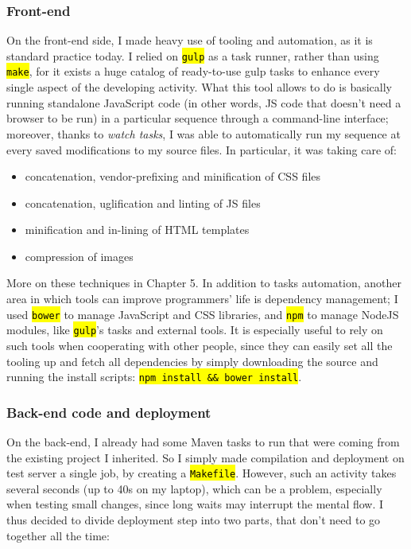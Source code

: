\documentclass[12pt,svgnames]{memoir}
\let\OldTexttt\texttt
\renewcommand{\texttt}[1]{\OldTexttt{\hl{#1}}}
\begin{document}
\subsubsection*{Front-end}\label{front-end}

On the front-end side, I made heavy use of tooling and automation, as it
is standard practice today. I relied on \texttt{gulp} as a task runner,
rather than using \texttt{make}, for it exists a huge catalog of
ready-to-use gulp tasks to enhance every single aspect of the developing
activity. What this tool allows to do is basically running standalone
JavaScript code (in other words, JS code that doesn't need a browser to
be run) in a particular sequence through a command-line interface;
moreover, thanks to \emph{watch tasks}, I was able to automatically run
my sequence at every saved modifications to my source files. In
particular, it was taking care of:

\begin{itemize}
\itemsep1pt\parskip0pt
\item
  concatenation, vendor-prefixing and minification of CSS files
\item
  concatenation, uglification and linting of JS files
\item
  minification and in-lining of HTML templates
\item
  compression of images
\end{itemize}

More on these techniques in Chapter 5. In addition to tasks automation,
another area in which tools can improve programmers' life is dependency
management; I used \texttt{bower} to manage JavaScript and CSS
libraries, and \texttt{npm} to manage NodeJS modules, like
\texttt{gulp}'s tasks and external tools. It is especially useful to
rely on such tools when cooperating with other people, since they can
easily set all the tooling up and fetch all dependencies by simply
downloading the source and running the install scripts:
\texttt{npm install \&\& bower install}.

\subsubsection*{Back-end code and
deployment}\label{back-end-code-and-deployment}

On the back-end, I already had some Maven tasks to run that were coming
from the existing project I inherited. So I simply made compilation and
deployment on test server a single job, by creating a \texttt{Makefile}.
However, such an activity takes several seconds (up to 40s on my
laptop), which can be a problem, especially when testing small changes,
since long waits may interrupt the mental flow. I thus decided to divide
deployment step into two parts, that don't need to go together all the
time:
\end{document}
